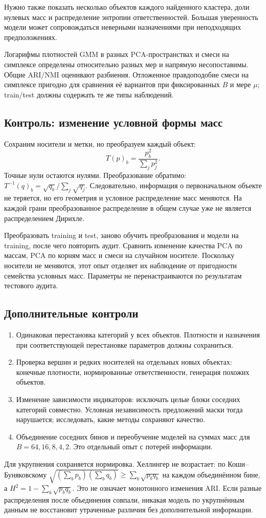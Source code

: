 \documentclass[11pt,a4paper]{article}
\begin{document}
Нужно также показать несколько объектов каждого найденного кластера,
доли нулевых масс и распределение энтропии ответственностей.
Большая уверенность модели может сопровождаться неверными назначениями
при неподходящих предположениях.

Логарифмы плотностей GMM в разных PCA-пространствах и смеси на симплексе
определены относительно разных мер и напрямую несопоставимы.
Общие ARI/NMI оценивают разбиения. Отложенное правдоподобие смеси на
симплексе пригодно для сравнения её вариантов при фиксированных $B$ и
мере $\mu$; train/test должны содержать те же типы наблюдений.

\subsection{Контроль: изменение условной формы масс}
Сохраним носители и метки, но преобразуем каждый объект:
\[
 T(p)_b=\frac{p_b^2}{\sum_jp_j^2}.
\]
Точные нули остаются нулями. Преобразование обратимо:
$T^{-1}(q)_b=\sqrt{q_b}/\sum_j\sqrt{q_j}$.
Следовательно, информация о первоначальном объекте не теряется,
но его геометрия и условное распределение масс меняются.
На каждой грани преобразованное распределение в общем случае уже
не является распределением Дирихле.

Преобразовать training и test, заново обучить преобразования и модели
на training, после чего повторить аудит. Сравнить изменение качества
PCA по массам, PCA по корням масс и смеси на случайном носителе.
Поскольку носители не меняются, этот опыт отделяет их наблюдение
от пригодности семейства условных масс. Параметры не перенастраиваются
по результатам тестового аудита.

\subsection{Дополнительные контроли}
\begin{enumerate}
\item Одинаковая перестановка категорий у всех объектов. Плотности и
назначения при соответствующей перестановке параметров должны сохраниться.
\item Проверка вершин и редких носителей на отдельных новых объектах:
конечные плотности, нормированные ответственности, генерация похожих объектов.
\item Изменение зависимости индикаторов: исключать целые блоки соседних
категорий совместно. Условная независимость предложений маски тогда
нарушается; исследовать, какие методы сохраняют качество.
\item Объединение соседних бинов и переобучение моделей на суммах масс
для $B=64,16,8,4,2$. Это отдельный опыт с потерей информации.
\end{enumerate}
Для укрупнения сохраняется нормировка. Хеллингер не возрастает:
по Коши--Буняковскому
$\sqrt{(\sum_bp_b)(\sum_bq_b)}\geq\sum_b\sqrt{p_bq_b}$
на каждом объединённом бине, а $H^2=1-\sum_b\sqrt{p_bq_b}$.
Это не означает монотонного изменения ARI. Если разные распределения
после объединения совпали, никакая модель по укрупнённым данным не
восстановит утраченные различия без дополнительной информации.
\end{document}
